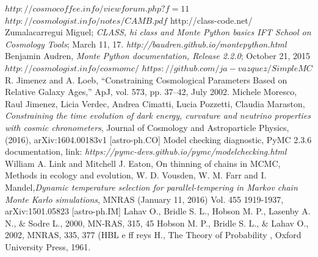 \documentclass[onecolumn,           %
               showpacs,            %
               preprintnumbers,     %
               aps,                 %
               prl,          	    %
               letterpaper,             %
               superscriptaddress,      %
               nofootinbib,         %
               tightenlines,        %
               floats,floatfix      %
               ,usenatbib,
               ]{revtex4-1}
\begin{document}
\begin{thebibliography}{9}
$http://cosmocoffee.info/viewforum.php?f=11$
 $http://cosmologist.info/notes/CAMB.pdf$
 http://class-code.net/
Zumalacarregui Miguel; \textit{CLASS, hi class and Monte Python basics IFT School on Cosmology Tools}; March 11, 17.
\textit{http://baudren.github.io/montepython.html}
Benjamin Audren, \textit{Monte Python documentation, Release 2.2.0}; October 21, 2015
$http://cosmologist.info/cosmomc/$	
$https://github.com/ja-vazquez/SimpleMC$
%
%
%
%
%
%
R. Jimenez and A. Loeb, “Constraining Cosmological Parameters Based on Relative Galaxy Ages,”
ApJ, vol. 573, pp. 37–42, July 2002.
Michele Moresco, Raul Jimenez, Licia Verdec, Andrea Cimatti, Lucia Pozzetti, Claudia Maraston, \textit{Constraining the time evolution of dark energy, curvature and neutrino properties with cosmic chronometers}, Journal of Cosmology and Astroparticle Physics, (2016), arXiv:1604.00183v1 [astro-ph.CO]
 Model checking diagnostic, PyMC 2.3.6 documentation, link: \textit{https://pymc-devs.github.io/pymc/modelchecking.html}
William A. Link and Mitchell J. Eaton, On thinning of chains in MCMC, Methods in ecology and evolution,
W. D. Vousden, W. M. Farr and I. Mandel,\textit{Dynamic temperature selection for parallel-tempering in Markov chain Monte Karlo simulations}, MNRAS (January 11, 2016) Vol. 455 1919-1937, arXiv:1501.05823 [astro-ph.IM]
Lahav O., Bridle S. L., Hobson M. P., Lasenby A. N., $\&$ Sodre L., 2000, MN-RAS, 315, 45
Hobson M. P., Bridle S. L., $\&$ Lahav O., 2002, MNRAS, 335, 377 (HBL
e
ff
reys H.,
The Theory of Probability
, Oxford University Press, 1961.

\end{thebibliography}
\end{document}
